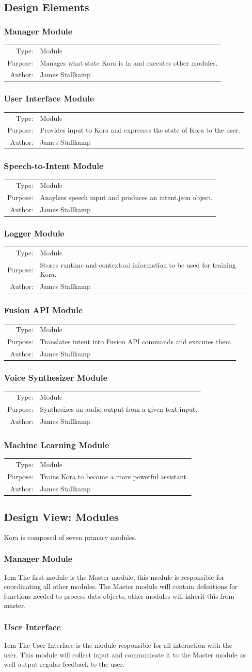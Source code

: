 \documentclass[onecolumn, draftclsnofoot,10pt, compsoc]{IEEEtran}
\def \botname{Kora\xspace}
\newenvironment{indentItem}[1][1cm]{\begin{adjustwidth}{#1}{}}{\end{adjustwidth}}
\newcommand{\designElementDef}[4]{
    \subsubsection{#1}
    \begin{tabular}[t]{r p{6in}}
        Type: & #2 \\
        Purpose: & #3 \\
        Author: & #4 \\
    \end{tabular}
}
\begin{document}
    \subsection{Design Elements} 
        \designElementDef{Manager Module}
                         {Module}
                         {Manages what state \botname is in and executes other modules.}
                         {James Stallkamp}
        \designElementDef{User Interface Module}
                         {Module}
                         {Provides input to \botname and expresses the state of \botname to the user.}
                         {James Stallkamp}
        \designElementDef{Speech-to-Intent Module}
                         {Module}
                         {Anaylzes speech input and produces an intent.json object.}
                         {James Stallkamp}
        \designElementDef{Logger Module}
                         {Module}
                         {Stores runtime and contextual information to be used for training \botname.}
                         {James Stallkamp}
        \designElementDef{Fusion API Module}
                         {Module}
                         {Translates intent into Fusion API commands and executes them.}
                         {James Stallkamp}
        \designElementDef{Voice Synthesizer Module}
                         {Module}
                         {Synthesizes an audio output from a given text input.}
                         {James Stallkamp}
        \designElementDef{Machine Learning Module}
                         {Module}
                         {Trains \botname to become a more powerful assistant.}
                         {James Stallkamp}
						 
    \subsection{Design View: Modules}
		\botname is composed of seven primary modules.
		\subsubsection{Manager Module}
			\begin{indentItem}
				The first module is the Master module, this module is responsible for coordinating all other modules.
				The Master module will contain definitions for functions needed to process data objects, other modules will inherit this from master.
			\end{indentItem}
		\subsubsection{User Interface}
			\begin{indentItem}
				The User Interface is the module responsible for all interaction with the user.
				This module will collect input and communicate it to the Master module as well output regular feedback to the user.
			\end{indentItem}
\end{document}
